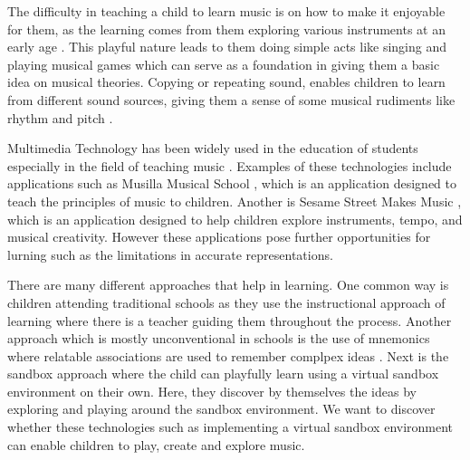 The difficulty in teaching a child to learn music is on how to make it enjoyable for them, as the learning comes from them exploring various instruments at an early age \cite{ghazali2005minds}. This playful nature leads to them doing simple acts like singing and playing musical games which can serve as a foundation in giving them a basic idea on musical theories. Copying or repeating sound, enables children to learn from different sound sources, giving them a sense of some musical rudiments like rhythm and pitch \cite{mcpherson2015child}. 


Multimedia Technology has been widely used in the education of students especially in the field of teaching music \cite{tong2016design}. Examples of these technologies include applications such as Musilla Musical School \cite{educationalappstore2017}, which is an application designed to teach the principles of music to children. Another is Sesame Street Makes Music \cite{educationalappstore2015}, which is an application designed to help children explore instruments, tempo, and musical creativity. However these applications pose further opportunities for lurning such as the limitations in accurate representations.


There are many different approaches that help in learning. One common way is children attending traditional schools as they use the instructional approach of learning where there is a teacher guiding them throughout the process. Another approach which is mostly unconventional in schools is the use of mnemonics where relatable associations are used to remember complpex ideas \cite{putnam2015mnemonics}. Next is the sandbox approach where the child can playfully learn using a virtual sandbox environment on their own. Here, they discover by themselves the ideas by exploring and playing around the sandbox environment. We want to discover whether these technologies such as implementing a virtual sandbox environment can enable children to play, create and explore music.

